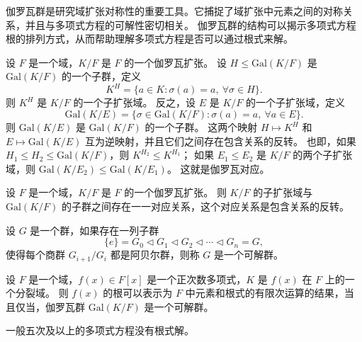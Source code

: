 \begin{note}
    伽罗瓦群是研究域扩张对称性的重要工具。它捕捉了域扩张中元素之间的对称关系，并且与多项式方程的可解性密切相关。
    伽罗瓦群的结构可以揭示多项式方程根的排列方式，从而帮助理解多项式方程是否可以通过根式来解。
\end{note}

\begin{definition}
    设 $F$ 是一个域，$K/F$ 是 $F$ 的一个伽罗瓦扩张。
    设 $H \leq \mathrm{Gal}(K/F)$ 是 $\mathrm{Gal}(K/F)$ 的一个子群，定义
    \[
        K^H = \{a\in K:\sigma(a)=a,\ \forall \sigma\in H\}.
    \]
    则 $K^H$ 是 $K/F$ 的一个子扩张域。
    反之，设 $E$ 是 $K/F$ 的一个子扩张域，定义
    \[
        \mathrm{Gal}(K/E) = \{\sigma\in \mathrm{Gal}(K/F):\sigma(a)=a,\ \forall a\in E\}.
    \]
    则 $\mathrm{Gal}(K/E)$ 是 $\mathrm{Gal}(K/F)$ 的一个子群。
    这两个映射 $H\mapsto K^H$ 和 $E\mapsto \mathrm{Gal}(K/E)$ 互为逆映射，并且它们之间存在包含关系的反转。
    也即，如果 $H_1 \leq H_2 \leq \mathrm{Gal}(K/F)$，则 $K^{H_2} \leq K^{H_1}$；
    如果 $E_1 \leq E_2$ 是 $K/F$ 的两个子扩张域，则 $\mathrm{Gal}(K/E_2) \leq \mathrm{Gal}(K/E_1)$。
    这就是伽罗瓦对应。
    \label{def:galois_correspondence}
\end{definition}

\begin{note}

\end{note}

\begin{theorem}
    设 $F$ 是一个域，$K/F$ 是 $F$ 的一个伽罗瓦扩张。
    则 $K/F$ 的子扩张域与 $\mathrm{Gal}(K/F)$ 的子群之间存在一一对应关系，这个对应关系是包含关系的反转。
    \label{thm:FundamentalTheoremOfGaloisTheory}
\end{theorem}

\begin{note}
    
\end{note}
\vspace{1em}

\begin{definition}
    设 $G$ 是一个群，如果存在一列子群
    \[
        \{e\} = G_0 \triangleleft G_1 \triangleleft G_2 \triangleleft \cdots \triangleleft G_n = G,
    \]
    使得每个商群 $G_{i+1}/G_i$ 都是阿贝尔群，则称 $G$ 是一个可解群。
    \label{def:solvable_group}
\end{definition}

\begin{theorem}
    设 $F$ 是一个域，$f(x)\in F[x]$ 是一个正次数多项式，$K$ 是 $f(x)$ 在 $F$ 上的一个分裂域。
    则 $f(x)$ 的根可以表示为 $F$ 中元素和根式的有限次运算的结果，当且仅当，伽罗瓦群 $\mathrm{Gal}(K/F)$ 是一个可解群。
    \label{thm:PolynomialEquationSolvabilityByRadicals}
\end{theorem}

\begin{theorem}
    一般五次及以上的多项式方程没有根式解。
    \label{thm:Abel_Galois_Theorem}
\end{theorem}

\newpage